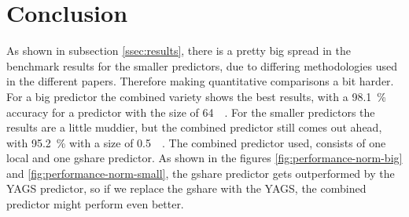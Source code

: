 \section{Conclusion}
\label{sec:conclusion}
As shown in subsection \ref{ssec:results}, there is a pretty big spread in the benchmark results for the smaller predictors, due to differing methodologies used in the different papers.
Therefore making quantitative comparisons a bit harder.
For a big predictor the combined variety shows the best results, with a \SI{98.1}{\percent} accuracy for a predictor with the size of \SI{64}{\kilo\byte}.
For the smaller predictors the results are a little muddier, but the combined predictor still comes out ahead, with \SI{95.2}{\percent} with a size of \SI{0.5}{\kilo\byte}.
The combined predictor used, consists of one local and one gshare predictor.
As shown in the figures \ref{fig:performance-norm-big} and \ref{fig:performance-norm-small}, the gshare predictor gets outperformed by the YAGS predictor, so if we replace the gshare with the YAGS, the combined predictor might perform even better.